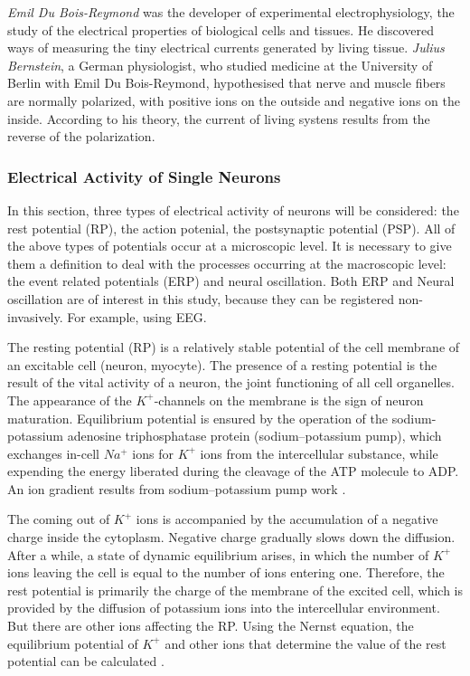\documentclass[14pt,a4paper]{scrartcl}
\begin{document}
\textit{Emil Du Bois-Reymond} was the developer of experimental electrophysiology, the study of the electrical properties of biological cells and tissues. He discovered ways of measuring the tiny electrical currents generated by living tissue. \textit{Julius Bernstein}, a German physiologist, who studied medicine at the University of Berlin with Emil Du Bois-Reymond, hypothesised that nerve and muscle fibers are normally polarized, with positive ions on the outside and negative ions on the inside. According to his theory, the current of living systens results from the reverse of the polarization.

\subsubsection{Electrical Activity of Single Neurons}
\label{sec:Hypothesis:Bioelectricity:Electrical Activity of Single Neurons}

In this section, three types of electrical activity of neurons will be considered: the rest potential (RP), the action potenial, the postsynaptic potential (PSP). All of the above types of potentials occur at a microscopic level. It is necessary to give them a definition to deal with the processes occurring at the macroscopic level: the event related potentials (ERP) and neural oscillation. Both ERP and Neural oscillation are of interest in this study, because they can be registered non-invasively. For example, using EEG.

The resting potential (RP) is a relatively stable potential of the cell membrane of an excitable cell (neuron, myocyte). The presence of a resting potential is the result of the vital activity of a neuron, the joint functioning of all cell organelles. The appearance of the $K^{+}$-channels on the membrane is the sign of neuron maturation. Equilibrium potential is ensured by the operation of the sodium-potassium adenosine triphosphatase protein (sodium–potassium pump), which exchanges in-cell $Na^{+}$ ions for $K^{+}$ ions from the intercellular substance, while expending the energy liberated during the cleavage of the ATP molecule to ADP. An ion gradient results from sodium–potassium pump work \cite{Purves2004}. 

The coming out of $K^{+}$ ions is accompanied by the accumulation of a negative charge inside the cytoplasm. Negative charge gradually slows down the diffusion. After a while, a state of dynamic equilibrium arises, in which the number of $K^{+}$ ions leaving the cell is equal to the number of ions entering one. Therefore, the rest potential is primarily the charge of the membrane of the excited cell, which is provided by the diffusion of potassium ions into the intercellular environment. But there are other ions affecting the RP. Using the Nernst equation, the equilibrium potential of $K^{+}$ and other ions that determine the value of the rest potential can be calculated \cite{Purves2004}.
\end{document}
